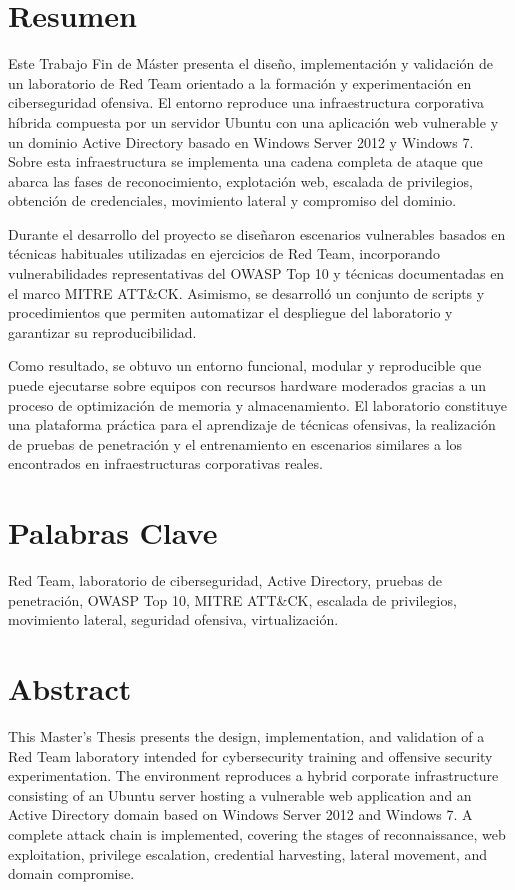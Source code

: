 \vspace*{-0.8cm}
\section*{Resumen}
\label{sec:resumen}

Este Trabajo Fin de Máster presenta el diseño, implementación y validación de un laboratorio de Red Team orientado a la formación y experimentación en ciberseguridad ofensiva. El entorno reproduce una infraestructura corporativa híbrida compuesta por un servidor Ubuntu con una aplicación web vulnerable y un dominio Active Directory basado en Windows Server 2012 y Windows 7. Sobre esta infraestructura se implementa una cadena completa de ataque que abarca las fases de reconocimiento, explotación web, escalada de privilegios, obtención de credenciales, movimiento lateral y compromiso del dominio.

Durante el desarrollo del proyecto se diseñaron escenarios vulnerables basados en técnicas habituales utilizadas en ejercicios de Red Team, incorporando vulnerabilidades representativas del OWASP Top 10 y técnicas documentadas en el marco MITRE ATT\&CK. Asimismo, se desarrolló un conjunto de scripts y procedimientos que permiten automatizar el despliegue del laboratorio y garantizar su reproducibilidad.

Como resultado, se obtuvo un entorno funcional, modular y reproducible que puede ejecutarse sobre equipos con recursos hardware moderados gracias a un proceso de optimización de memoria y almacenamiento. El laboratorio constituye una plataforma práctica para el aprendizaje de técnicas ofensivas, la realización de pruebas de penetración y el entrenamiento en escenarios similares a los encontrados en infraestructuras corporativas reales.


\vfill
\vspace{0.5cm}
\section*{Palabras Clave}
\label{sec:palabra_clave}

Red Team, laboratorio de ciberseguridad, Active Directory, pruebas de penetración, OWASP Top 10, MITRE ATT\&CK, escalada de privilegios, movimiento lateral, seguridad ofensiva, virtualización.
\vfill
\vfill
\vfill
\vfill
    

\cleartooddpage
\clearpage

\vspace*{-0.8cm}
\section*{Abstract}
\label{sec:abstract}
This Master's Thesis presents the design, implementation, and validation of a Red Team laboratory intended for cybersecurity training and offensive security experimentation. The environment reproduces a hybrid corporate infrastructure consisting of an Ubuntu server hosting a vulnerable web application and an Active Directory domain based on Windows Server 2012 and Windows 7. A complete attack chain is implemented, covering the stages of reconnaissance, web exploitation, privilege escalation, credential harvesting, lateral movement, and domain compromise.

